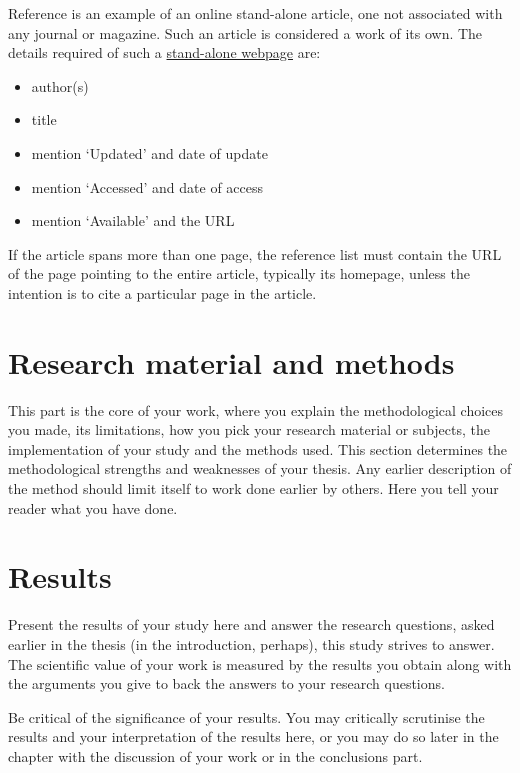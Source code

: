 \documentclass[english, 12pt, a4paper, sci, utf8, a-2b, online]{aaltothesis}
\begin{document}
\noindent
Reference \cite{webpage} is an example of an online stand-alone article, one not
associated with any journal or magazine. Such an article is considered a work of
its own. The details required of such a \underline{stand-alone webpage} 
are:
\begin{itemize}
\setlength{\itemsep}{-3pt}
\item[--] author(s)
\item[--] title
\item[--] mention `Updated' and date of update
\item[--] mention `Accessed' and date of access
\item[--] mention `Available' and the URL
\end{itemize}
If the article spans more than one page, the reference list must contain the URL
of the page pointing to the entire article, typically its homepage, unless the 
intention is to cite a particular page in the article.


\clearpage

\section{Research material and methods}

This part is the core of your work, where you explain the methodological choices
you made, its limitations, how you pick your research material or subjects, the 
implementation of your study and the methods used. This section determines the 
methodological strengths and weaknesses of your thesis. Any earlier description 
of the method should limit itself to work done earlier by others. Here you tell 
your reader what you have done.

\clearpage

\section{Results}

Present the results of your study here and answer the research questions, asked 
earlier in the thesis (in the introduction, perhaps), this study strives to 
answer. The scientific value of your work is measured by the results you obtain 
along with the arguments you give to back the answers to your research 
questions.

Be critical of the significance of your results. You may critically scrutinise 
the results and your interpretation of the results here, or you may do so later 
in the chapter with the discussion of your work or in the conclusions part.
\end{document}
